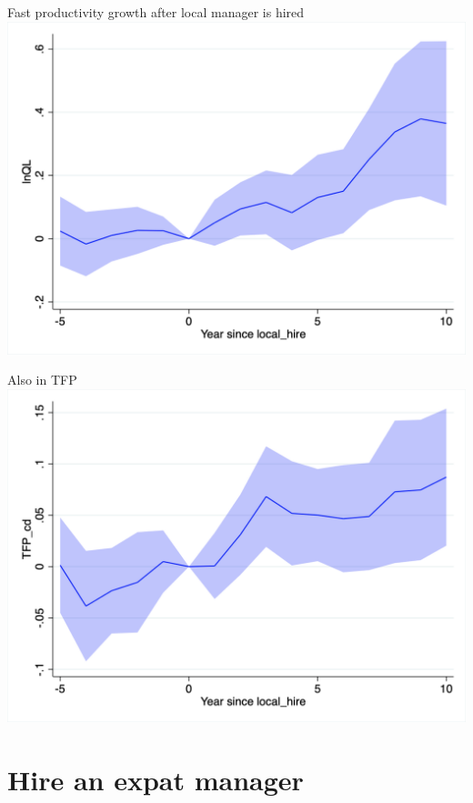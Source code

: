 \documentclass[
  ignorenonframetext,
  aspectratio=43,
]{beamer}
\begin{document}
\begin{frame}{Fast productivity growth after local manager is hired}
\protect\hypertarget{fast-productivity-growth-after-local-manager-is-hired}{}
\includegraphics{figure/event_study/local_hire_lnQL.png}
\end{frame}

\begin{frame}{Also in TFP}
\protect\hypertarget{also-in-tfp}{}
\includegraphics{figure/event_study/local_hire_TFP_cd.png}
\end{frame}

\hypertarget{hire-an-expat-manager}{%
\section{Hire an expat manager}\label{hire-an-expat-manager}}
\end{document}
